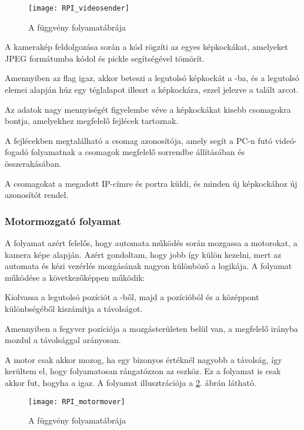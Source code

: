 \begin{figure}[h!]
	\centering
	\texttt{[image: RPI\_videosender]}
	\caption{A  függvény folyamatábrája}
	\label{fig:RPI_videosender}
\end{figure}
\begin{list}{-}{}
	\item A kamerakép feldolgozása során a kód rögzíti az egyes képkockákat, amelyeket JPEG formátumba kódol és pickle segítségével tömörít.
	\item Amennyiben az  flag igaz, akkor beteszi a legutolsó képkockát a -ba, és a  legutolsó elemei alapján húz egy téglalapot illeszt a képkockára, ezzel jelezve a talált arcot.
	\item Az adatok nagy mennyiségét figyelembe véve a képkockákat kisebb csomagokra bontja, amelyekhez megfelelő fejlécek tartoznak.
	\item A fejlécekben megtalálható a csomag azonosítója, amely segít a PC-n futó videó-fogadó folyamatnak a csomagok megfelelő sorrendbe állításában és összerakásában.
	\item A csomagokat a megadott IP-címre és portra küldi, és minden új képkockához új azonosítót rendel.
\end{list}




\pagebreak

\subsubsection*{Motormozgató folyamat}
A  folyamat azért felelős, hogy automata működés során mozgassa a motorokat, a kamera képe alapján. Azért gondoltam, hogy jobb így külön kezelni, mert az automata és kézi vezérlés mozgásának nagyon különböző a logikája. A folyamat működése a következőképpen működik:

\begin{list}{-}{}
	\item Kiolvassa a legutolsó pozíciót a -ből, majd a pozícióból és a középpont különbségéből kiszámítja a távolságot.
	\item Amennyiben a fegyver pozíciója a mozgásterületen belül van, a megfelelő irányba mozdul a távolsággal arányosan.
\end{list}

A motor csak akkor mozog, ha egy bizonyos értéknél nagyobb a távolság, így kerültem el, hogy folyamatosan rángatózzon az eszköz. Ez a folyamat is csak akkor fut, hogyha a  igaz. A folyamat illusztrációja a \ref{fig:RPI_motormover}. ábrán látható.


\begin{figure}[h!]
	\centering
	\texttt{[image: RPI\_motormover]}
	\caption{A  függvény folyamatábrája}
	\label{fig:RPI_motormover}
\end{figure}